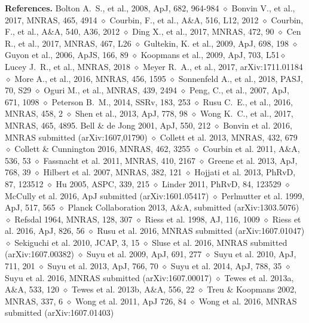\documentclass[a4paper,11pt]{article}
\begin{document}
{\bf References.} Bolton A.~S., et al., 2008, ApJ, 682, 964-984 $\diamond$ Bonvin V., et al., 2017, MNRAS, 465, 4914 $\diamond$ Courbin, F., et al., A\&A, 516, L12, 2012 $\diamond$ Courbin, F., et al., A\&A, 540, A36, 2012 $\diamond$ Ding X., et al., 2017, MNRAS, 472, 90 $\diamond$ Cen R., et al., 2017, MNRAS, 467, L26 $\diamond$ Gultekin, K. et al., 2009, ApJ, 698, 198 $\diamond$ Guyon et al., 2006, ApJS, 166, 89 $\diamond$ Koopmans et al., 2009, ApJ, 703, L51$\diamond$ Lucey J.~R., et al., MNRAS, 2018 $\diamond$ Meyer R.~A., et al., 2017, arXiv:1711.01184 $\diamond$ More A., et al., 2016, MNRAS, 456, 1595 $\diamond$ Sonnenfeld A., et al., 2018, PASJ, 70, S29 $\diamond$ Oguri M., et al., MNRAS, 439, 2494 $\diamond$ Peng, C., et al., 2007, ApJ, 671, 1098 $\diamond$ Peterson B.~M., 2014, SSRv, 183, 253 $\diamond$ Rusu C.~E., et al., 2016, MNRAS, 458, 2 $\diamond$ Shen et al., 2013, ApJ, 778, 98 $\diamond$ Wong K.~C., et al., 2017, MNRAS, 465, 4895.
Bell \& de Jong 2001, ApJ, 550, 212
$\diamond$ Bonvin et al. 2016, MNRAS submitted (arXiv:1607,01790)
$\diamond$ Collett et al. 2013, MNRAS, 432, 679
$\diamond$ Collett \& Cunnington 2016, MNRAS, 462, 3255
$\diamond$ Courbin et al. 2011, A\&A, 536, 53
$\diamond$ Fassnacht et al. 2011, MNRAS, 410, 2167
$\diamond$ Greene et al. 2013, ApJ, 768, 39
$\diamond$ Hilbert et al. 2007, MNRAS, 382, 121
$\diamond$ Hojjati et al. 2013, PhRvD, 87, 123512
$\diamond$ Hu 2005, ASPC, 339, 215
$\diamond$ Linder 2011, PhRvD, 84, 123529
$\diamond$ McCully et al. 2016, ApJ submitted (arXiv:1601.05417)
$\diamond$ Perlmutter et al. 1999, ApJ, 517, 565
$\diamond$ Planck Collaboration 2013, A\&A, submitted (arXiv:1303.5076)
$\diamond$ Refsdal 1964, MNRAS, 128, 307
$\diamond$ Riess et al. 1998, AJ, 116, 1009
$\diamond$ Riess et al. 2016, ApJ, 826, 56
$\diamond$ Rusu et al. 2016, MNRAS submitted (arXiv:1607.01047)
$\diamond$ Sekiguchi et al. 2010, JCAP, 3, 15
$\diamond$ Sluse et al. 2016, MNRAS submitted (arXiv:1607.00382)
$\diamond$ Suyu et al. 2009, ApJ, 691, 277
$\diamond$ Suyu et al. 2010, ApJ, 711, 201
$\diamond$ Suyu et al. 2013, ApJ, 766, 70
$\diamond$ Suyu et al. 2014, ApJ, 788, 35
$\diamond$ Suyu et al. 2016, MNRAS submitted (arXiv:1607.00017)
$\diamond$ Tewes et al. 2013a, A\&A, 533, 120
$\diamond$ Tewes et al. 2013b, A\&A, 556, 22
$\diamond$ Treu \& Koopmans 2002, MNRAS, 337, 6
$\diamond$ Wong et al. 2011, ApJ 726, 84
$\diamond$ Wong et al. 2016, MNRAS submitted (arXiv:1607.01403)
\end{document}
